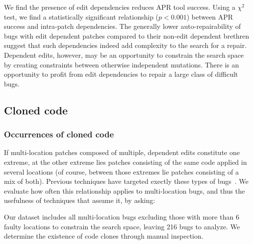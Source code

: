 \documentclass[10pt, conference]{IEEEtran}
\begin{document}
We find the presence of edit dependencies 
reduces APR tool success.
Using a $\chi^2$ test, we find a statistically significant relationship ($p < 0.001$)
between APR success and intra-patch dependencies.
The generally lower auto-repairability of bugs with edit dependent patches compared 
to their non-edit dependent brethren suggest that such dependencies indeed 
add complexity to the search for a repair.
Dependent edits, however, may 
be an opportunity to constrain the search space by creating constraints between 
otherwise independent mutations. There is an opportunity to profit from edit 
dependencies to repair a large class of difficult bugs.


\subsection{Cloned code}
\label{sec:clones}

\subsubsection{Occurrences of cloned code}

If multi-location patches composed of multiple, dependent edits constitute one
extreme, at the other extreme lies patches consisting of the same code applied
in several locations (of course, between those extremes lie patches consisting
of a mix of both). Previous techniques have targeted exectly these types of
bugs~\cite{wang2018,saha2019harnessing}.  We evaluate how often this relationship applies to
multi-location bugs, and thus the usefulness of techniques that assume it, by asking: 



Our dataset includes all multi-location bugs excluding those with more than 6 faulty locations to 
constrain the search space, leaving 216 bugs to analyze. We determine the existence of code 
clones through manual inspection.
\end{document}
